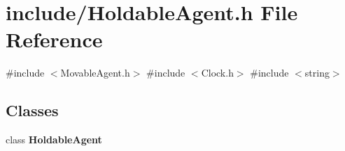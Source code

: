 \section{include/\+Holdable\+Agent.h File Reference}
\label{_holdable_agent_8h}
{\ttfamily \#include $<$Movable\+Agent.\+h$>$}\newline
{\ttfamily \#include $<$Clock.\+h$>$}\newline
{\ttfamily \#include $<$string$>$}\newline
\subsection*{Classes}
\begin{DoxyCompactItemize}
\item 
class \textbf{ Holdable\+Agent}
\end{DoxyCompactItemize}
